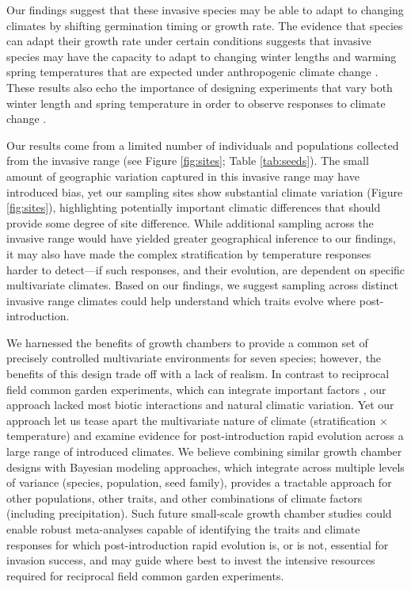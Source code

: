 \documentclass[12pt]{article}\usepackage[]{graphicx}\usepackage[]{color}
\begin{document}
	Our findings suggest that these invasive species may be able to adapt to changing climates by shifting germination timing or growth rate. The evidence that species can adapt their growth rate under certain conditions suggests that invasive species may have the capacity to adapt to changing winter lengths and warming spring temperatures that are expected under anthropogenic climate change \parencite{IPCC2015}. These results also echo the  importance of designing experiments that vary both winter length and spring temperature in order to observe responses to climate change \parencite[e.g.,][]{Bernareggi2016}. 

	Our results come from a limited number of individuals and populations collected from the invasive range (see Figure \ref{fig:sites}; Table \ref{tab:seeds}). The small amount of geographic variation captured in this invasive range may have introduced bias, yet our sampling sites show substantial climate variation (Figure \ref{fig:sites}), highlighting potentially important climatic differences that should provide some degree of site difference.  While additional sampling across the invasive range would have yielded greater geographical inference to our findings, it may also have made the complex stratification by temperature responses harder to detect---if such responses, and their evolution, are dependent on specific multivariate climates. Based on our findings, we suggest sampling across distinct invasive range climates could help understand which traits evolve where post-introduction. %

	We harnessed the benefits of growth chambers to provide a common set of precisely controlled multivariate environments for seven species; however, the benefits of this design trade off with a lack of realism. In contrast to reciprocal field common garden experiments, which can integrate important factors \parencite{Germain2018,Blois2013}, our approach lacked most biotic interactions and natural climatic variation. Yet our approach let us tease apart the multivariate nature of climate (stratification $\times$ temperature) and examine evidence for post-introduction rapid evolution across a large range of introduced climates. We believe combining similar growth chamber designs with Bayesian modeling approaches, which integrate across multiple levels of variance (species, population, seed family), provides a tractable approach for other populations, other traits, and other combinations of climate factors (including precipitation). Such future small-scale growth chamber studies could enable robust meta-analyses capable of identifying the traits and climate responses for which post-introduction rapid evolution is, or is not, essential for invasion success, and may guide where best to invest the intensive resources required for reciprocal field common garden experiments. %
	
\end{document}
